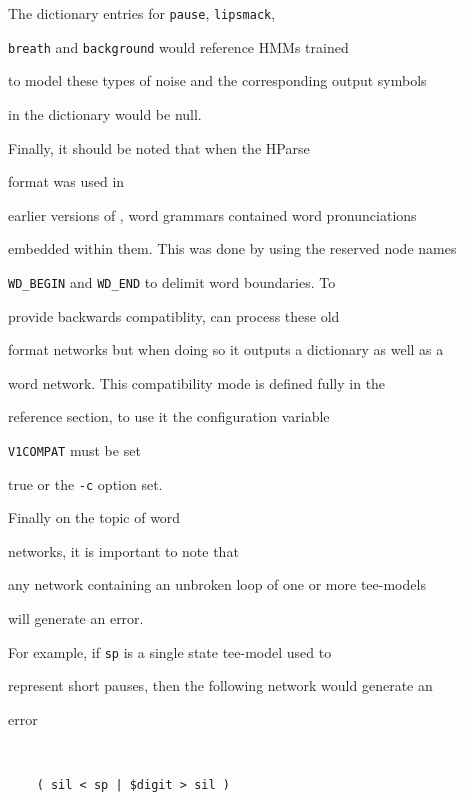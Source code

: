 The dictionary entries for \texttt{pause}, \texttt{lipsmack}, 


\texttt{breath} and \texttt{background} would reference HMMs trained


to model these types of noise and the corresponding output symbols


in the dictionary would be null.





Finally, it should be noted that when the HParse 


format was used in


earlier versions of \HTK, word grammars contained word pronunciations


embedded within them.  This was done by using the reserved node names


\texttt{WD\_BEGIN} and \texttt{WD\_END} to delimit word boundaries. To


provide backwards compatiblity,  can process these old


format networks but when doing so it outputs a dictionary as well as a


word network.  This compatibility mode is defined fully in the


reference section, to use it the configuration variable


\texttt{V1COMPAT} must be set 


true or the \texttt{-c} option set.





Finally on the topic of word 


networks, it is important to note that


any network containing an unbroken loop of one or more tee-models


will generate an error.  


For example, if \texttt{sp} is a single state tee-model used to 


represent short pauses, then the following network would generate an


error


\begin{verbatim}


    ( sil < sp | $digit > sil )


\end{verbatim}


